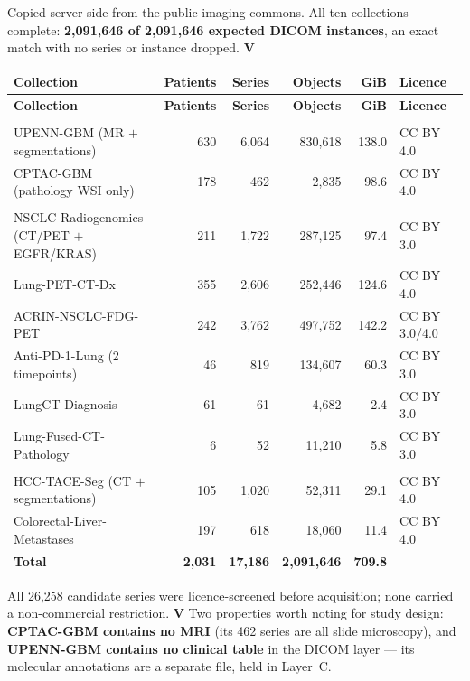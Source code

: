 \documentclass[11pt,a4paper]{article}
\newcommand{\ver}{\textcolor{qgreen}{\textbf{V}}}
\begin{document}
Copied server-side from the public imaging commons. All ten collections complete:
\textbf{2{,}091{,}646 of 2{,}091{,}646 expected DICOM instances}, an exact match with no
series or instance dropped. \ver

\begin{center}
\small
\begin{longtable}{@{}lrrrrl@{}}
\toprule
\textbf{Collection} & \textbf{Patients} & \textbf{Series} & \textbf{Objects} &
\textbf{GiB} & \textbf{Licence} \\
\midrule
\endfirsthead
\toprule \textbf{Collection} & \textbf{Patients} & \textbf{Series} & \textbf{Objects} &
\textbf{GiB} & \textbf{Licence} \\ \midrule
\endhead
\bottomrule
\endfoot
\multicolumn{6}{@{}l}{\itshape Glioma} \\
UPENN-GBM (MR $+$ segmentations) & 630 & 6{,}064 & 830{,}618 & 138.0 & CC BY 4.0 \\
CPTAC-GBM (pathology WSI only) & 178 & 462 & 2{,}835 & 98.6 & CC BY 4.0 \\
\addlinespace
\multicolumn{6}{@{}l}{\itshape Lung} \\
NSCLC-Radiogenomics (CT/PET $+$ EGFR/KRAS) & 211 & 1{,}722 & 287{,}125 & 97.4 & CC BY 3.0 \\
Lung-PET-CT-Dx & 355 & 2{,}606 & 252{,}446 & 124.6 & CC BY 4.0 \\
ACRIN-NSCLC-FDG-PET & 242 & 3{,}762 & 497{,}752 & 142.2 & CC BY 3.0/4.0 \\
Anti-PD-1-Lung (2 timepoints) & 46 & 819 & 134{,}607 & 60.3 & CC BY 3.0 \\
LungCT-Diagnosis & 61 & 61 & 4{,}682 & 2.4 & CC BY 3.0 \\
Lung-Fused-CT-Pathology & 6 & 52 & 11{,}210 & 5.8 & CC BY 3.0 \\
\addlinespace
\multicolumn{6}{@{}l}{\itshape Liver} \\
HCC-TACE-Seg (CT $+$ segmentations) & 105 & 1{,}020 & 52{,}311 & 29.1 & CC BY 4.0 \\
Colorectal-Liver-Metastases & 197 & 618 & 18{,}060 & 11.4 & CC BY 4.0 \\
\midrule
\textbf{Total} & \textbf{2{,}031} & \textbf{17{,}186} & \textbf{2{,}091{,}646} &
\textbf{709.8} & \\
\end{longtable}
\end{center}

\noindent
All 26{,}258 candidate series were licence-screened before acquisition; none carried a
non-commercial restriction. \ver{} Two properties worth noting for study design:
\textbf{CPTAC-GBM contains no MRI} (its 462 series are all slide microscopy), and
\textbf{UPENN-GBM contains no clinical table} in the DICOM layer --- its molecular
annotations are a separate file, held in Layer~C.
\end{document}
